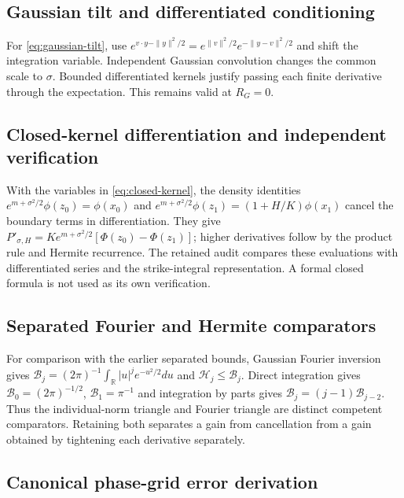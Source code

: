 \documentclass[11pt]{article}
\newcommand{\R}{\mathbb R}
\begin{document}
\subsection{Gaussian tilt and differentiated conditioning}
\label{app:gaussian-tilt-detail}

For \eqref{eq:gaussian-tilt}, use
$e^{v\cdot y-\|y\|^2/2}=e^{\|v\|^2/2}e^{-\|y-v\|^2/2}$ and shift the
integration variable.  Independent Gaussian convolution changes the common
scale to $\sigma$.  Bounded differentiated kernels justify passing each
finite derivative through the expectation.  This remains valid at $R_G=0$.

\subsection{Closed-kernel differentiation and independent verification}
\label{app:kernel-differentiation}

With the variables in \eqref{eq:closed-kernel}, the density identities
$e^{m+\sigma^2/2}\phi(z_0)=\phi(x_0)$ and
$e^{m+\sigma^2/2}\phi(z_1)=(1+H/K)\phi(x_1)$ cancel the boundary terms
in differentiation.  They give
$P'_{\sigma,H}=Ke^{m+\sigma^2/2}[\Phi(z_0)-\Phi(z_1)]$;
higher derivatives follow by the product rule and Hermite recurrence.
The retained audit compares these evaluations with differentiated series
and the strike-integral representation.  A formal closed formula is not
used as its own verification.

\subsection{Separated Fourier and Hermite comparators}
\label{app:fourier-comparators}

For comparison with the earlier separated bounds, Gaussian Fourier
inversion gives
$\mathcal B_j=(2\pi)^{-1}\int_\R |u|^je^{-u^2/2}du$ and
$\mathcal H_j\leq\mathcal B_j$.
Direct integration gives $\mathcal B_0=(2\pi)^{-1/2}$,
$\mathcal B_1=\pi^{-1}$ and
integration by parts gives $\mathcal B_j=(j-1)\mathcal B_{j-2}$.
Thus the individual-norm triangle and Fourier triangle are distinct
competent comparators.  Retaining both separates a gain from cancellation
from a gain obtained by tightening each derivative separately.

\subsection{Canonical phase-grid error derivation}
\label{app:canonical-sketch}
\end{document}
